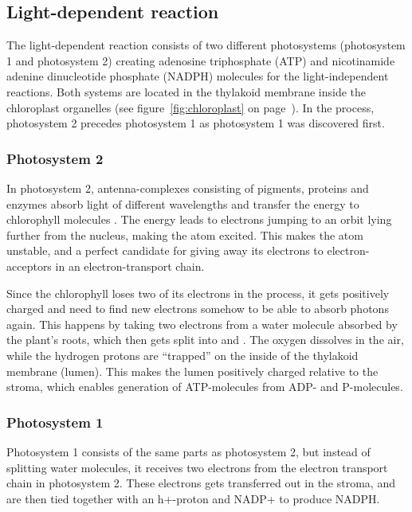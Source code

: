 \subsection{Light-dependent reaction}
The light-dependent reaction consists of two different photosystems (photosystem 1 and photosystem 2) creating adenosine triphosphate (ATP) and nicotinamide adenine dinucleotide phosphate (NADPH) molecules for the light-independent reactions. Both systems are located in the thylakoid membrane inside the chloroplast organelles (see figure~\ref{fig:chloroplast} on page~\pageref{fig:chloroplast}). In the process, photosystem 2 precedes photosystem 1 as photosystem 1 was discovered first. 

\subsubsection{Photosystem 2}
In photosystem 2, antenna-complexes consisting of pigments, proteins and enzymes absorb light of different wavelengths and transfer the energy to chlorophyll molecules \citep{bios}. The energy leads to electrons jumping to an orbit lying further from the nucleus, making the atom excited. This makes the atom unstable, and a perfect candidate for giving away its electrons to electron-acceptors in an electron-transport chain.

Since the chlorophyll loses two of its electrons in the process, it gets positively charged and need to find new electrons somehow to be able to absorb photons again. This happens by taking two electrons from a water molecule absorbed by the plant's roots, which then gets split into  and  \citep{bios}. The oxygen dissolves in the air, while the hydrogen protons are “trapped” on the inside of the thylakoid membrane (lumen). This makes the lumen positively charged relative to the stroma, which enables generation of ATP-molecules from ADP- and P-molecules. 

\subsubsection{Photosystem 1}
Photosystem 1 consists of the same parts as photosystem 2, but instead of splitting water molecules, it receives two electrons from the electron transport chain in photosystem 2. These electrons gets transferred out in the stroma, and are then tied together with an h+-proton and NADP+ to produce NADPH.

